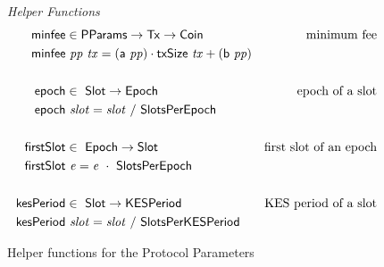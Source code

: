 \begin{figure*}[htb]
  \emph{Helper Functions}
  \begin{align*}
    \mathsf{minfee} & \in \mathsf{PParams} \to \mathsf{Tx} \to \mathsf{Coin} & \text{minimum fee}\\
    \mathsf{minfee} & ~\mathit{pp}~\mathit{tx} =
    (\mathsf{a}~\mathit{pp}) \cdot \mathsf{txSize}~\mathit{tx} + (\mathsf{b}~\mathit{pp})
    \\
    \\
    \mathsf{epoch} & \in ~ \mathsf{Slot} \to \mathsf{Epoch} & \text{epoch of a slot}
    \\
    \mathsf{epoch} & ~\mathit{slot} = \mathit{slot}~/~\mathsf{SlotsPerEpoch}
    \\
    \\
    \mathsf{firstSlot} & \in ~ \mathsf{Epoch} \to \mathsf{Slot}
               & \text{first slot of an epoch}
    \\
    \mathsf{firstSlot} & ~\mathit{e} = \mathit{e}~\cdot~\mathsf{SlotsPerEpoch}
    \\
    \\
    \mathsf{kesPeriod} & \in ~ \mathsf{Slot} \to \mathsf{KESPeriod} & \text{KES period of a slot}
    \\
    \mathsf{kesPeriod} & ~\mathit{slot} = \mathit{slot}~/~\mathsf{SlotsPerKESPeriod}
  \end{align*}
  \caption{Helper functions for the Protocol Parameters}
  \label{fig:defs:protocol-parameters-helpers}
\end{figure*}

\clearpage
